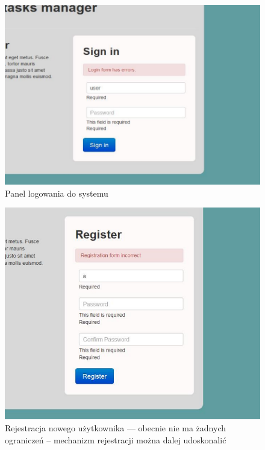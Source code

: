 \documentclass[a4paper,12pt,notitlepage]{mwrep}
\begin{document}
\begin{figure}[H]
\centering
\includegraphics[scale=0.5]{images/app/1.png}
\caption{Panel logowania do systemu}
\label{fig:app_login}
\end{figure}

\begin{figure}[H]
\centering
\includegraphics[scale=0.6]{images/app/2.png}
\caption{Rejestracja nowego użytkownika --- obecnie nie ma żadnych ograniczeń -- mechanizm rejestracji można dalej udoskonalić}
\label{fig:app_register}
\end{figure}
\end{document}

